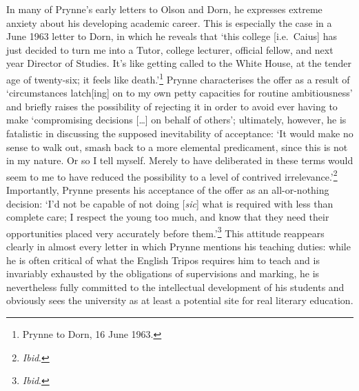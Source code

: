 \documentclass[]{article}
\begin{document}
\noindent In many of Prynne’s early letters to Olson and Dorn, he
expresses extreme anxiety about his developing academic career. This is
especially the case in a June 1963 letter to Dorn, in which he reveals
that ‘this college {[}i.e.~Caius{]} has just decided to turn me into a
Tutor, college lecturer, official fellow, and next year Director of
Studies. It’s like getting called to the White House, at the tender age
of twenty-six; it feels like death.’\footnote{Prynne to Dorn, 16 June
  1963.} Prynne characterises the offer as a result of ‘circumstances
latch{[}ing{]} on to my own petty capacities for routine ambitiousness’
and briefly raises the possibility of rejecting it in order to avoid
ever having to make ‘compromising decisions {[}\ldots{}{]} on behalf of
others’; ultimately, however, he is fatalistic in discussing the
supposed inevitability of acceptance: ‘It would make no sense to walk
out, smash back to a more elemental predicament, since this is not in my
nature. Or so I tell myself. Merely to have deliberated in these terms
would seem to me to have reduced the possibility to a level of contrived
irrelevance.’\footnote{\emph{Ibid}.} Importantly, Prynne presents his
acceptance of the offer as an all-or-nothing decision: ‘I’d not be
capable of not doing {[}\emph{sic}{]} what is required with less than
complete care; I respect the young too much, and know that they need
their opportunities placed very accurately before them.’\footnote{\emph{Ibid}.}
This attitude reappears clearly in almost every letter in which Prynne
mentions his teaching duties: while he is often critical of what the
English Tripos requires him to teach and is invariably exhausted by the
obligations of supervisions and marking, he is nevertheless fully
committed to the intellectual development of his students and obviously
sees the university as at least a potential site for real literary
education.
\end{document}
